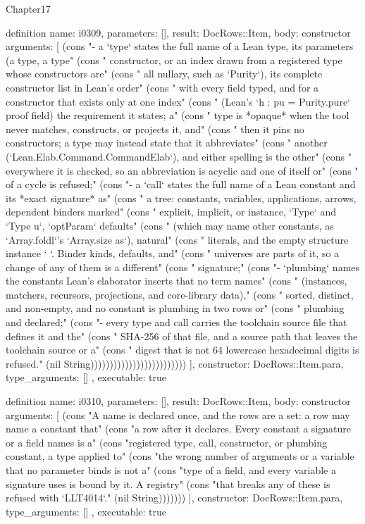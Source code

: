 \begin{lexlean}{Chapter17}
\begin{semanticmodule}
definition{
  name: i0309,
  parameters: [],
  result: DocRows::Item,
  body: constructor{
    arguments: [
      (cons "- a `type` states the full name of a Lean type, its parameters (a type, a type" (cons "  constructor, or an index drawn from a registered type whose constructors are" (cons "  all nullary, such as `Purity`), its complete constructor list in Lean's order" (cons "  with every field typed, and for a constructor that exists only at one index" (cons "  (Lean's `h : pu = Purity.pure` proof field) the requirement it states; a" (cons "  type is *opaque* when the tool never matches, constructs, or projects it, and" (cons "  then it pins no constructors; a type may instead state that it abbreviates" (cons "  another (`Lean.Elab.Command.CommandElab`), and either spelling is the other" (cons "  everywhere it is checked, so an abbreviation is acyclic and one of itself or" (cons "  of a cycle is refused;" (cons "- a `call` states the full name of a Lean constant and its *exact signature* as" (cons "  a tree: constants, variables, applications, arrows, dependent binders marked" (cons "  explicit, implicit, or instance, `Type` and `Type u`, `optParam` defaults" (cons "  (which may name other constants, as `Array.foldl`'s `Array.size as`), natural" (cons "  literals, and the empty structure instance `{ }`. Binder kinds, defaults, and" (cons "  universes are parts of it, so a change of any of them is a different" (cons "  signature;" (cons "- `plumbing` names the constants Lean's elaborator inserts that no term names" (cons "  (instances, matchers, recursors, projections, and core-library data)," (cons "  sorted, distinct, and non-empty, and no constant is plumbing in two rows or" (cons "  plumbing and declared;" (cons "- every type and call carries the toolchain source file that defines it and the" (cons "  SHA-256 of that file, and a source path that leaves the toolchain source or a" (cons "  digest that is not 64 lowercase hexadecimal digits is refused." (nil String)))))))))))))))))))))))))
    ],
    constructor: DocRows::Item.para,
    type_arguments: []
  },
  executable: true
}

definition{
  name: i0310,
  parameters: [],
  result: DocRows::Item,
  body: constructor{
    arguments: [
      (cons "A name is declared once, and the rows are a set: a row may name a constant that" (cons "a row after it declares. Every constant a signature or a field names is a" (cons "registered type, call, constructor, or plumbing constant, a type applied to" (cons "the wrong number of arguments or a variable that no parameter binds is not a" (cons "type of a field, and every variable a signature uses is bound by it. A registry" (cons "that breaks any of these is refused with `LLT4014`." (nil String)))))))
    ],
    constructor: DocRows::Item.para,
    type_arguments: []
  },
  executable: true
}


\end{semanticmodule}
\end{lexlean}
